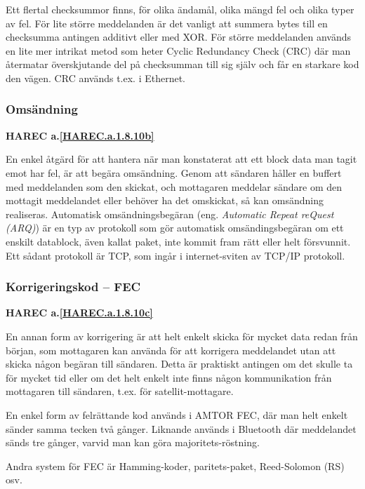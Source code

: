 Ett flertal checksummor finns, för olika ändamål, olika mängd fel och olika
typer av fel. För lite större meddelanden är det vanligt att summera bytes
till en checksumma antingen additivt eller med XOR. För större meddelanden
används en lite mer intrikat metod som heter Cyclic Redundancy Check (CRC)
där man återmatar överskjutande del på checksumman till sig själv och får en
starkare kod den vägen. CRC används t.ex. i Ethernet.

\subsubsection{Omsändning}
\textbf{HAREC a.\ref{HAREC.a.1.8.10b}\label{myHAREC.a.1.8.10b}}

En enkel åtgärd för att hantera när man konstaterat att ett block data man
tagit emot har fel, är att begära omsändning. Genom att sändaren håller en
buffert med meddelanden som den skickat, och mottagaren meddelar sändare om
den mottagit meddelandet eller behöver ha det omskickat, så kan omsändning
realiseras. Automatisk omsändningsbegäran (eng. \emph{Automatic Repeat reQuest
(ARQ)}) är en typ av protokoll som gör automatisk omsändingsbegäran om ett
enskilt datablock, även kallat paket, inte kommit fram rätt eller helt
försvunnit. Ett sådant protokoll är TCP, som ingår i internet-sviten av TCP/IP
protokoll.

\subsubsection{Korrigeringskod -- FEC}
\textbf{HAREC a.\ref{HAREC.a.1.8.10c}\label{myHAREC.a.1.8.10c}}

En annan form av korrigering är att helt enkelt skicka för mycket data redan
från början, som mottagaren kan använda för att korrigera meddelandet utan att
skicka någon begäran till sändaren. Detta är praktiskt antingen om det skulle
ta för mycket tid eller om det helt enkelt inte finns någon kommunikation från
mottagaren till sändaren, t.ex. för satellit-mottagare.

En enkel form av felrättande kod används i AMTOR FEC, där man helt enkelt
sänder samma tecken två gånger. Liknande används i Bluetooth där meddelandet
sänds tre gånger, varvid man kan göra majoritets-röstning.

Andra system för FEC är Hamming-koder, paritets-paket, Reed-Solomon (RS) osv.

